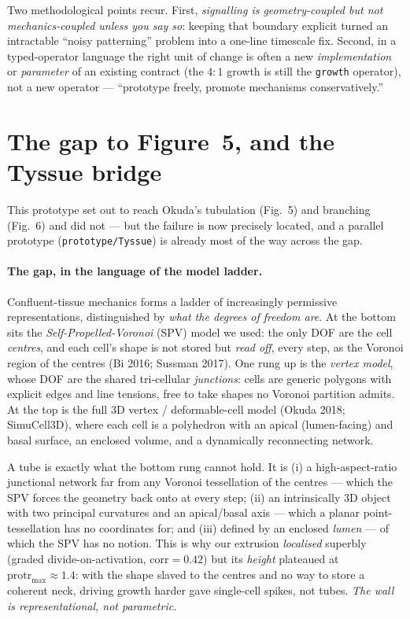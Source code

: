 \documentclass[11pt]{article}
\begin{document}
Two methodological points recur. First, \emph{signalling is geometry-coupled but not
mechanics-coupled unless you say so}: keeping that boundary explicit turned an intractable ``noisy
patterning'' problem into a one-line timescale fix. Second, in a typed-operator language the right
unit of change is often a new \emph{implementation} or \emph{parameter} of an existing contract (the
$4{:}1$ growth is still the \texttt{growth} operator), not a new operator --- ``prototype freely,
promote mechanisms conservatively.''

\section{The gap to Figure~5, and the Tyssue bridge}
This prototype set out to reach Okuda's tubulation (Fig.~5) and branching (Fig.~6) and did not --- but
the failure is now precisely located, and a parallel prototype (\texttt{prototype/Tyssue}) is already
most of the way across the gap.

\paragraph{The gap, in the language of the model ladder.} Confluent-tissue mechanics forms a ladder of
increasingly permissive representations, distinguished by \emph{what the degrees of freedom are}. At the
bottom sits the \emph{Self-Propelled-Voronoi} (SPV) model we used: the only DOF are the cell
\emph{centres}, and each cell's shape is not stored but \emph{read off}, every step, as the Voronoi
region of the centres (Bi 2016; Sussman 2017). One rung up is the \emph{vertex model}, whose DOF are the
shared tri-cellular \emph{junctions}: cells are generic polygons with explicit edges and line tensions,
free to take shapes no Voronoi partition admits. At the top is the full 3D vertex / deformable-cell
model (Okuda 2018; SimuCell3D), where each cell is a polyhedron with an apical (lumen-facing) and basal
surface, an enclosed volume, and a dynamically reconnecting network.

A tube is exactly what the bottom rung cannot hold. It is (i) a high-aspect-ratio junctional network far
from any Voronoi tessellation of the centres --- which the SPV forces the geometry back onto at every
step; (ii) an intrinsically 3D object with two principal curvatures and an apical/basal axis --- which a
planar point-tessellation has no coordinates for; and (iii) defined by an enclosed \emph{lumen} --- of
which the SPV has no notion. This is why our extrusion \emph{localised} superbly (graded
divide-on-activation, $\mathrm{corr}\!=\!0.42$) but its \emph{height} plateaued at $\mathrm{protr}_{\max}
\!\approx\!1.4$: with the shape slaved to the centres and no way to store a coherent neck, driving growth
harder gave single-cell spikes, not tubes. \emph{The wall is representational, not parametric.}
\end{document}
